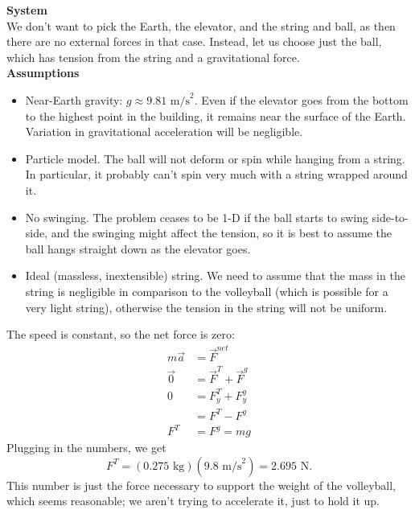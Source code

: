\documentclass[]{article}
\begin{document}
\begin{TeacherMargin}
\noindent\textbf{System} \\
We don't want to pick the Earth, the elevator, and the string and ball, as then there are no external forces in that case. Instead, let us choose just the ball, which has tension from the string and a gravitational force. \\

\noindent\textbf{Assumptions}
\begin{itemize}
	\item Near-Earth gravity: $g\approx9.81\text{ m/s}^{2}$. Even if the elevator goes from the bottom to the highest point in the building, it remains near the surface of the Earth. Variation in gravitational acceleration will be negligible.
	\item Particle model. The ball will not deform or spin while hanging from a string. In particular, it probably can't spin very much with a string wrapped around it.
	\item No swinging. The problem ceases to be 1-D if the ball starts to swing side-to-side, and the swinging might affect the tension, so it is best to assume the ball hangs straight down as the elevator goes.
	\item Ideal (massless, inextensible) string. We need to assume that the mass in the string is negligible in comparison to the volleyball (which is possible for a very light string), otherwise the tension in the string will not be uniform.
\end{itemize}
\begin{center}
\end{center}
The speed is constant, so the net force is zero:
\begin{align*}
	m\vec{a} & = \vec{F}^{net} \\
	\vec{0} & = \vec{F}^{T}+\vec{F}^{g} \\
	0 & = F^{T}_{y} + F^{g}_{y} \\
	& = F^{T} - F^{g} \\
	F^{T} & = F^{g} = mg
\end{align*}
Plugging in the numbers, we get
\[
F^{T} = (0.275\text{ kg})(9.8\text{ m/s}^{2}) = 2.695\text{ N}.
\]
This number is just the force necessary to support the weight of the volleyball, which seems reasonable; we aren't trying to accelerate it, just to hold it up.
\end{TeacherMargin}
\end{document}
